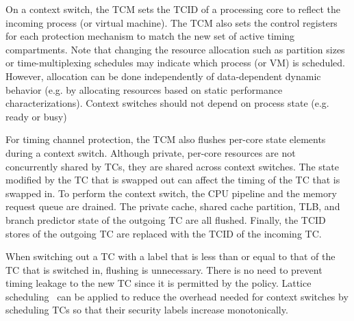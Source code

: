 On a context switch, the TCM sets the TCID of a processing core to reflect
the incoming process (or virtual machine). The TCM also sets the control
registers for each protection mechanism to match the new set of active
timing compartments. Note that changing the resource allocation such as
partition sizes or time-multiplexing schedules may indicate
which process (or VM) is scheduled. However, allocation can be done
independently of data-dependent dynamic behavior (e.g. by allocating resources
based on static performance characterizations). Context switches should not 
depend on process state (e.g. ready or busy)

For timing channel protection, the TCM also flushes per-core state elements
during a context switch.
Although private, per-core resources are not concurrently shared by TCs, they 
are shared across context switches. The state modified by the TC that is 
swapped out can affect the timing of the TC that is swapped in.
To perform the context switch, the CPU pipeline and the memory request queue 
are drained. 
The private cache, shared cache 
partition, TLB, and branch predictor state of the outgoing TC are all flushed.  
Finally, the TCID stores of the outgoing TC are replaced with the TCID of the 
incoming TC. 

When switching out a TC with a label that is less than or equal to that of the 
TC that is switched in, flushing is unnecessary. There is no need to prevent 
timing leakage to the new TC since it is permitted by the policy.
Lattice scheduling~\cite{lattice-scheduling} can be applied to reduce the
overhead needed for context switches by scheduling TCs so that their security
labels increase monotonically. 




